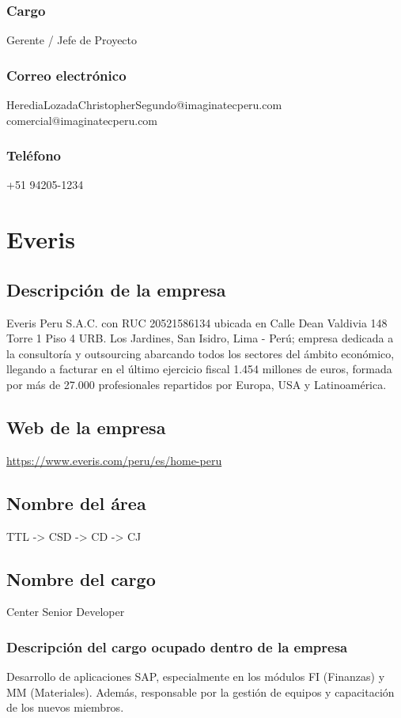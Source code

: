 \subsubsection{Cargo} 
Gerente / Jefe de Proyecto 

\subsubsection{Correo electrónico} 
HerediaLozadaChristopherSegundo@imaginatecperu.com 
comercial@imaginatecperu.com 

\subsubsection{Teléfono} 
+51 94205-1234




\section{Everis}

\subsection{Descripción de la empresa}
Everis Peru S.A.C. con RUC 20521586134 ubicada en Calle Dean Valdivia 148 Torre 1 Piso 4 URB. Los Jardines, San Isidro, Lima - Perú; empresa dedicada a la consultoría y outsourcing abarcando todos los sectores del ámbito económico, llegando a facturar en el último ejercicio fiscal 1.454 millones de euros, formada por más de 27.000 profesionales repartidos por Europa, USA y Latinoamérica.

\subsection{Web de la empresa}
\url{https://www.everis.com/peru/es/home-peru}

\subsection{Nombre del área}
TTL -> CSD -> CD -> CJ

\subsection{Nombre del cargo}
Center Senior Developer

\subsubsection{Descripción del cargo ocupado dentro de la empresa} 
Desarrollo de aplicaciones SAP, especialmente en los módulos FI (Finanzas) y MM (Materiales). Además, responsable por la gestión de equipos y capacitación de los nuevos miembros.

